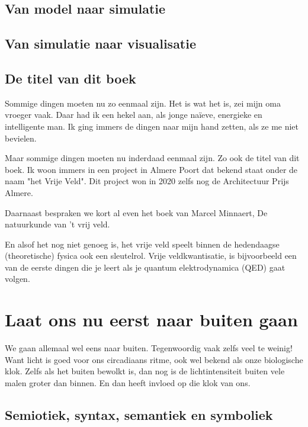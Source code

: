 \documentclass{article}      %
\begin{document}
\subsection{Van model naar simulatie}

\subsection{Van simulatie naar visualisatie}


\subsection{De titel van dit boek}

Sommige dingen moeten nu zo eenmaal zijn. Het is wat het is, zei mijn oma 
vroeger vaak. Daar had ik een hekel aan, als jonge naïeve, energieke en
intelligente man. Ik ging immers de dingen naar mijn hand zetten, als ze 
me niet bevielen.

Maar sommige dingen moeten nu inderdaad eenmaal zijn. Zo ook de titel van 
dit boek. Ik woon immers in een project in Almere Poort dat bekend staat
onder de naam "het Vrije Veld". Dit project won in 2020 zelfs nog de 
Architectuur Prijs Almere.

Daarnaast bespraken we kort al even het boek van Marcel Minnaert,
De natuurkunde van 't vrij veld.

En alsof het nog niet genoeg is, het vrije veld speelt binnen de 
hedendaagse (theoretische) fysica ook een sleutelrol. Vrije veldkwantisatie, 
is bijvoorbeeld een van de eerste dingen die je leert als je quantum 
elektrodynamica (QED) gaat volgen.

\section{Laat ons nu eerst naar buiten gaan}

We gaan allemaal wel eens naar buiten. Tegenwoordig vaak zelfs veel te weinig!
Want licht is goed voor ons circadiaans ritme, ook wel bekend als onze 
biologische klok. Zelfs als het buiten bewolkt is, dan nog is de lichtintensiteit  
buiten vele malen groter dan binnen. En dan heeft invloed op die klok van ons.



\subsection{Semiotiek, syntax, semantiek en symboliek}
\end{document}
